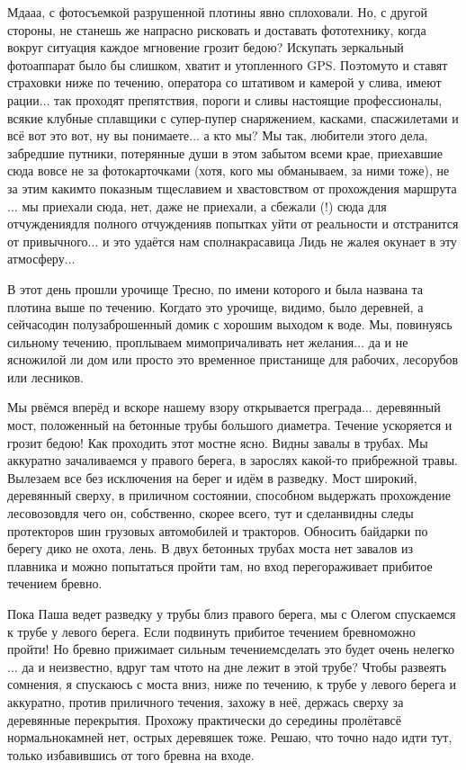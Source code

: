 Мда\sdash а\sdash а, с фотосъемкой разрушенной плотины явно сплоховали. Но, с другой стороны, не станешь же напрасно рисковать и доставать фототехнику, когда вокруг ситуация каждое мгновение грозит бедою? Искупать зеркальный фотоаппарат было бы слишком, хватит и утопленного GPS. Поэтому\sdash то и ставят страховки ниже по течению, оператора со штативом и камерой у слива, имеют рации$\ldots$ так проходят препятствия, пороги и сливы настоящие профессионалы, всякие клубные сплавщики с супер-пупер снаряжением, касками, спасжилетами и всё вот это вот, ну вы понимаете$\ldots$ а кто мы? Мы так, любители этого дела, забредшие путники, потерянные души в этом забытом всеми крае, приехавшие сюда вовсе не за фотокарточками (хотя, кого мы обманываем, за ними тоже), не за этим каким\sdash то показным тщеславием и хвастовством от прохождения маршрута$\ldots$ мы приехали сюда, нет, даже не приехали, а сбежали (!) сюда для отчуждения\mdash для полного отчуждения\mdash в попытках уйти от реальности и отстранится от привычного$\ldots$ и это удаётся нам сполна\mdash красавица Лидь не жалея окунает в эту атмосферу$\ldots$

В этот день прошли урочище Тресно, по имени которого и была названа та плотина выше по течению. Когда\sdash то это урочище, видимо, было деревней, а сейчас\mdash один полузаброшенный домик с хорошим выходом к воде. Мы, повинуясь сильному течению, проплываем мимо\mdash причаливать нет желания$\ldots$ да и не ясно\mdash жилой ли дом или просто это временное пристанище для рабочих, лесорубов или лесников.

Мы рвёмся вперёд и вскоре нашему взору открывается преграда$\ldots$ деревянный мост, положенный на бетонные трубы большого диаметра. Течение ускоряется и грозит бедою! Как проходить этот мост\mdash не ясно. Видны завалы в трубах. Мы аккуратно зачаливаемся у правого берега, в зарослях какой-то прибрежной травы. Вылезаем все без исключения на берег и идём в разведку. Мост широкий, деревянный сверху, в приличном состоянии, способном выдержать прохождение лесовозов\mdash для чего он, собственно, скорее всего, тут и сделан\mdash видны следы протекторов шин грузовых автомобилей и тракторов. Обносить байдарки по берегу дико не охота, лень. В двух бетонных трубах моста нет завалов из плавника и можно попытаться пройти там, но вход перегораживает прибитое течением бревно. 

Пока Паша ведет разведку у трубы близ правого берега, мы с Олегом спускаемся к трубе у левого берега. Если подвинуть прибитое течением бревно\mdash можно пройти! Но бревно прижимает сильным течением\mdash сделать это будет очень нелегко$\ldots$ да и неизвестно, вдруг там что\sdash то на дне лежит в этой трубе? Чтобы развеять сомнения, я спускаюсь с моста вниз, ниже по течению, к трубе у левого берега и аккуратно, против приличного течения, захожу в неё, держась сверху за деревянные перекрытия. Прохожу практически до середины пролёта\mdash всё нормально\mdash камней нет, острых деревяшек тоже. Решаю, что точно надо идти тут, только избавившись от того бревна на входе.

